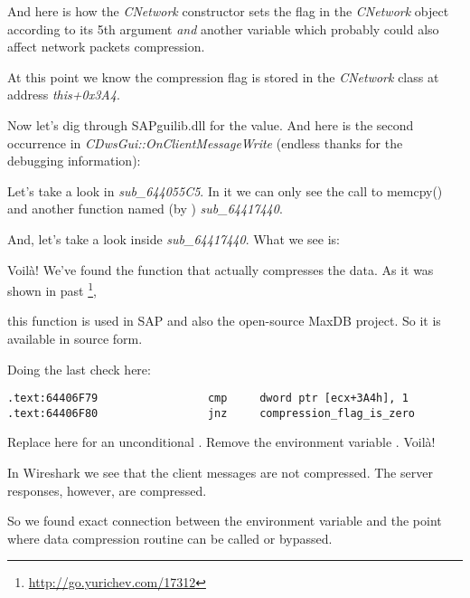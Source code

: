 And here is how the \emph{CNetwork} constructor sets the flag in the \emph{CNetwork} object according to its 5th argument \emph{and}
another variable which probably could also affect network packets compression.



At this point we know the compression flag is stored in the \emph{CNetwork} class at address \emph{this+0x3A4}.

Now let's dig through SAPguilib.dll for the  value. And here is the second occurrence in 
\emph{CDwsGui::OnClientMessageWrite} (endless thanks for the debugging information):



Let's take a look in \emph{sub\_644055C5}. In it we can only see the call to memcpy() and another function named 
(by \IDA) \emph{sub\_64417440}.

And, let's take a look inside \emph{sub\_64417440}. What we see is:



Voilà! We've found the function that actually compresses the data.
As it was shown in past
\footnote{\url{http://go.yurichev.com/17312}},

this function is used in SAP and also the open-source MaxDB project. 
So it is available in source form.

Doing the last check here:

\begin{lstlisting}[style=customasmx86]
.text:64406F79                 cmp     dword ptr [ecx+3A4h], 1
.text:64406F80                 jnz     compression_flag_is_zero
\end{lstlisting}

Replace \JNZ here for an unconditional \JMP. Remove the environment variable \TDWNC. Voilà!

In Wireshark we see that the client messages are not compressed. The server responses, however, are compressed.

So we found exact connection between the environment variable and the point where data compression 
routine can be called or bypassed.

